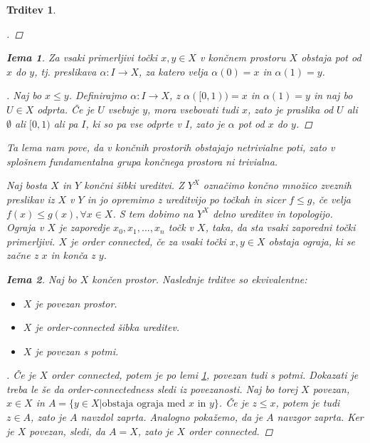 \documentclass[a4paper,12pt]{article}
\theoremstyle{definition}
\theoremstyle{plain}
\theoremstyle{definition}
\theoremstyle{plain}
\newtheorem{trditev}{Trditev}
\theoremstyle{plain}
\theoremstyle{plain}
\theoremstyle{plain}
\newtheorem{lema}{Iema}
\newenvironment{dokaz}{\begin{proof}[\bfseries\upshape\proofname]}{\end{proof}}
\begin{document}
\begin{trditev}
\begin{dokaz}
\end{dokaz}


\begin{lema}\label{lem:pot}
    Za vsaki primerljivi točki $x,y\in X$ v končnem prostoru $X$ obstaja pot od $x$ do $y$, tj. preslikava $\alpha: I \rightarrow X$, za katero velja $\alpha(0)=x$ in $\alpha(1)=y$.

\end{lema}
\begin{dokaz}
    Naj bo $x \leq y$. Definirajmo $\alpha:I\rightarrow X$, z $\alpha([0,1))=x$ in $\alpha(1)=y$ in naj bo $U\in X$ odprta. Če je $U$ vsebuje $y$, mora vsebovati tudi $x$, 
    zato je praslika od $U$ ali $\emptyset$ ali $[0,1)$ ali pa $I$, ki so pa vse odprte v $I$, zato je $\alpha$ pot od $x$ do $y$.
\end{dokaz}
Ta lema nam pove, da v končnih prostorih obstajajo netrivialne poti, zato v splošnem fundamentalna grupa končnega prostora ni trivialna.

Naj bosta $X$ in $Y$ končni šibki ureditvi. Z $Y^X$ označimo končno množico zveznih preslikav iz $X$ v $Y$ in jo opremimo z ureditvijo po točkah in sicer $f\leq g$, če velja $f(x) \leq g(x), \forall x\in X$. S tem dobimo na $Y^X$ delno ureditev in topologijo. \textit{Ograja} v $X$ je zaporedje $x_0,x_1,...,x_n$ točk v $X$, taka, da sta vsaki zaporedni točki primerljivi. $X$ je \textit{order 
connected}, če za vsaki točki $x,y\in X$ obstaja ograja, ki se začne z $x$ in konča z $y$.
\begin{lema}
    Naj bo $X$ končen prostor. Naslednje trditve so ekvivalentne:

    \begin{itemize}
        \label{lem:povezanost}
        \item $X$ je povezan prostor.
        \item $X$ je order-connected šibka ureditev.
        \item $X$ je povezan s potmi.
    \end{itemize}
\end{lema}


\begin{dokaz}
    Če je $X$ order connected, potem je po lemi \ref{lem:pot}, povezan tudi s potmi.
    Dokazati je treba le še da order-connectedness sledi iz povezanosti. Naj bo torej $X$ povezan, $x\in X$ in $A=\{y\in X| \text{obstaja ograja med $x$ in $y$}\}$. Če 
    je $z\leq x$, potem je tudi $z\in A$, zato je $A$ navzdol zaprta. Analogno pokažemo, da je $A$ navzgor zaprta. Ker je $X$ povezan, sledi, da $A=X$, zato je $X$ order connected.
\end{dokaz}


\end{trditev}
\end{document}
